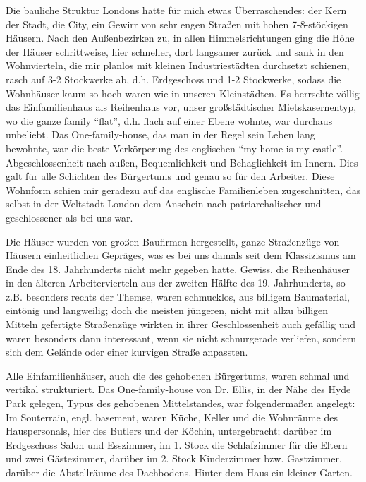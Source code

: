 Die bauliche Struktur Londons hatte für mich etwas Überraschendes: der Kern der Stadt, die City, ein Gewirr von sehr engen Straßen mit hohen 7-8-stöckigen Häusern. Nach den Außenbezirken zu, in allen Himmelsrichtungen ging die Höhe der Häuser schrittweise, hier schneller, dort langsamer zurück und sank in den Wohnvierteln, die mir planlos mit kleinen Industriestädten durchsetzt schienen, rasch auf 3-2 Stockwerke ab, d.h. Erdgeschoss und 1-2 Stockwerke, sodass die Wohnhäuser kaum so hoch waren wie in unseren Kleinstädten. Es herrschte völlig das Einfamilienhaus als Reihenhaus vor, unser großstädtischer Mietskasernentyp, wo die ganze family \enquote{flat}, d.h. flach auf einer Ebene wohnte, war durchaus unbeliebt. Das One-family-house, das man in der Regel sein Leben lang bewohnte, war die beste Verkörperung des englischen \enquote{my home is my castle}. Abgeschlossenheit nach außen, Bequemlichkeit und Behaglichkeit im Innern. Dies galt für alle Schichten des Bürgertums und genau so für den Arbeiter. Diese Wohnform schien mir geradezu auf das englische Familienleben zugeschnitten, das selbst in der Weltstadt London dem Anschein nach patriarchalischer und geschlossener als bei uns war.

Die Häuser wurden von großen Baufirmen hergestellt, ganze Straßenzüge von Häusern einheitlichen Gepräges, was es bei uns damals seit dem Klassizismus am Ende des 18. Jahrhunderts nicht mehr gegeben hatte. Gewiss, die Reihenhäuser in den älteren Arbeitervierteln aus der zweiten Hälfte des 19. Jahrhunderts, so z.B. besonders rechts der Themse, waren schmucklos, aus billigem Baumaterial, eintönig und langweilig; doch die meisten jüngeren, nicht mit allzu billigen Mitteln gefertigte Straßenzüge wirkten in ihrer Geschlossenheit auch gefällig und waren besonders dann interessant, wenn sie nicht schnurgerade verliefen, sondern sich dem Gelände oder einer kurvigen Straße anpassten.

Alle Einfamilienhäuser, auch die des gehobenen Bürgertums, waren schmal und vertikal strukturiert. Das One-family-house von Dr. Ellis, in der Nähe des Hyde Park gelegen, Typus des gehobenen Mittelstandes, war folgendermaßen angelegt: Im Souterrain, engl. basement, waren Küche, Keller und die Wohnräume des Hauspersonals, hier des Butlers und der Köchin, untergebracht; darüber im Erdgeschoss Salon und Esszimmer, im 1. Stock die Schlafzimmer für die Eltern und zwei Gästezimmer, darüber im 2. Stock Kinderzimmer bzw. Gastzimmer, darüber die Abstellräume des Dachbodens. Hinter dem Haus ein kleiner Garten.

